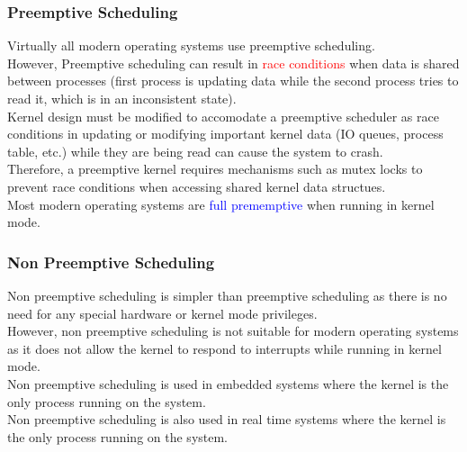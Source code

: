 \documentclass{book/custombook}
\begin{document}
                \subsubsection{Preemptive Scheduling}
                    Virtually all modern operating systems use preemptive scheduling.\\
                    However, Preemptive scheduling can result in \textcolor{red}{race conditions} when
                    data is shared between processes (first process is updating data while the second process
                    tries to read it, which is in an inconsistent state).\\
                    Kernel design must be modified to accomodate a preemptive scheduler as race conditions
                    in updating or modifying important kernel data (IO queues, process table, etc.) while they 
                    are being read can cause the system to crash.\\
                    Therefore, a preemptive kernel requires mechanisms such as mutex locks to prevent race conditions
                    when accessing shared kernel data structues.\\
                    Most modern operating systems are \textcolor{blue}{full prememptive} when running in kernel mode.
                \subsubsection{Non Preemptive Scheduling}
                    Non preemptive scheduling is simpler than preemptive scheduling as there is no need 
                    for any special hardware or kernel mode privileges.\\
                    However, non preemptive scheduling is not suitable for modern operating systems as it   
                    does not allow the kernel to respond to interrupts while running in kernel mode.\\
                    Non preemptive scheduling is used in embedded systems where the kernel is the only process
                    running on the system.\\
                    Non preemptive scheduling is also used in real time systems where the kernel is the only process 
                    running on the system.\\
\end{document}
